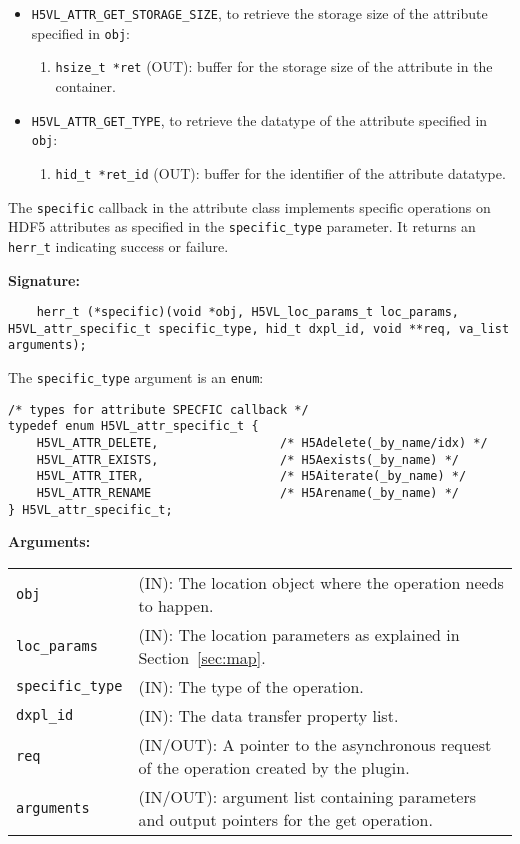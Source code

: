 \begin{itemize}
\item \texttt{H5VL\_ATTR\_GET\_STORAGE\_SIZE}, to retrieve the storage
  size of the attribute specified in \texttt{obj}:
  \begin{enumerate}
  \item \texttt{hsize\_t *ret} (OUT): buffer for the storage size of
    the attribute in the container.
  \end{enumerate}

\item \texttt{H5VL\_ATTR\_GET\_TYPE}, to retrieve the datatype of the
  attribute specified in \texttt{obj}:
  \begin{enumerate}
  \item \texttt{hid\_t *ret\_id} (OUT): buffer for the identifier of the
    attribute datatype.
  \end{enumerate}
  
\end{itemize}

The \texttt{specific} callback in the attribute class implements specific operations on HDF5 attributes as specified in the \texttt{specific\_type} parameter. It returns an \texttt{herr\_t} indicating success or failure.\bigskip

\begin{mdframed}[style=bgbox]
\textbf{Signature:}
\begin{lstlisting}
	herr_t (*specific)(void *obj, H5VL_loc_params_t loc_params, H5VL_attr_specific_t specific_type, hid_t dxpl_id, void **req, va_list arguments);
\end{lstlisting}

The \texttt{specific\_type} argument is an \texttt{enum}:
\begin{lstlisting}
/* types for attribute SPECFIC callback */
typedef enum H5VL_attr_specific_t {
    H5VL_ATTR_DELETE,                 /* H5Adelete(_by_name/idx) */
    H5VL_ATTR_EXISTS,                 /* H5Aexists(_by_name) */
    H5VL_ATTR_ITER,                   /* H5Aiterate(_by_name) */
    H5VL_ATTR_RENAME                  /* H5Arename(_by_name) */
} H5VL_attr_specific_t;
\end{lstlisting}

\textbf{Arguments:}\\
\begin{tabular}{l p{13.5cm}}
  \texttt{obj} & (IN): The location object  where the operation needs to happen.\\
  \texttt{loc\_params} & (IN): The location parameters as explained in Section~\ref{sec:map}.\\
  \texttt{specific\_type} & (IN): The type of the operation.\\
  \texttt{dxpl\_id} & (IN): The data transfer property list.\\
  \texttt{req} & (IN/OUT): A pointer to the asynchronous request of the
  operation created by the plugin.\\
  \texttt{arguments} & (IN/OUT): argument list containing parameters and
  output pointers for the get operation. \\
\end{tabular}
\end{mdframed}

